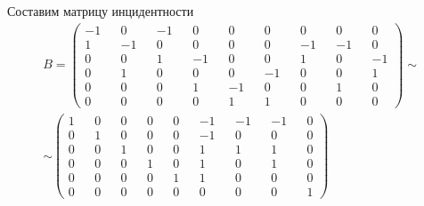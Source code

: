 \documentclass{article}
\begin{document}
Составим матрицу инцидентности
\begin{equation*}
    \begin{split}
        B =
        \begin{pmatrix}
            -1 &&  0 && -1 &&  0 &&  0 &&  0 &&  0 &&  0 &&  0 \\
             1 && -1 &&  0 &&  0 &&  0 &&  0 && -1 && -1 &&  0 \\
             0 &&  0 &&  1 && -1 &&  0 &&  0 &&  1 &&  0 && -1 \\
             0 &&  1 &&  0 &&  0 &&  0 && -1 &&  0 &&  0 &&  1 \\
             0 &&  0 &&  0 &&  1 && -1 &&  0 &&  0 &&  1 &&  0 \\
             0 &&  0 &&  0 &&  0 &&  1 &&  1 &&  0 &&  0 &&  0
        \end{pmatrix}
        \sim \\ \sim
        \begin{pmatrix}
            1 && 0 && 0 && 0 && 0 && -1 && -1 && -1 && 0 \\
            0 && 1 && 0 && 0 && 0 && -1 &&  0 &&  0 && 0 \\
            0 && 0 && 1 && 0 && 0 &&  1 &&  1 &&  1 && 0 \\
            0 && 0 && 0 && 1 && 0 &&  1 &&  0 &&  1 && 0 \\
            0 && 0 && 0 && 0 && 1 &&  1 &&  0 &&  0 && 0 \\
            0 && 0 && 0 && 0 && 0 &&  0 &&  0 &&  0 && 1
        \end{pmatrix}
    \end{split}
\end{equation*}
\end{document}
